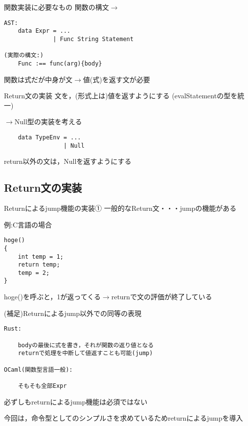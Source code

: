 \documentclass[uplatex,dvipdfmx,ja=standard]{beamer}
\begin{document}
\begin{frame}[fragile]{関数実装に必要なもの}
    関数の構文$\to$
    \begin{verbatim}
AST:
    data Expr = ...
              | Func String Statement

(実際の構文:)
    Func :== func(arg){body}
    \end{verbatim}
関数は式だが中身が文$\to$値(式)を返す文が必要
\end{frame}

\begin{frame}[fragile]{Return文の実装}
    文を，(形式上は)値を返すようにする (evalStatementの型を統一)

    $\to$Null型の実装を考える
    \begin{verbatim}
    data TypeEnv = ... 
                 | Null
    \end{verbatim}
    return以外の文は，Nullを返すようにする

\end{frame}

\subsection{Return文の実装}

\begin{frame}[fragile]{Returnによるjump機能の実装①}
一般的なReturn文・・・jumpの機能がある

例:C言語の場合
    \begin{verbatim}
hoge()
{
    int temp = 1;
    return temp;
    temp = 2;
}
    \end{verbatim}
hoge()を呼ぶと，1が返ってくる$\to$returnで文の評価が終了している
\end{frame}

\begin{frame}[fragile]{(補足)Returnによるjump以外での同等の表現}
    \begin{verbatim}
Rust:

    bodyの最後に式を書き，それが関数の返り値となる
    returnで処理を中断して値返すことも可能(jump)

OCaml(関数型言語一般):

    そもそも全部Expr

    \end{verbatim}
必ずしもreturnによるjump機能は必須ではない

今回は，命令型としてのシンプルさを求めているためreturnによるjumpを導入
\end{frame}
\end{document}
